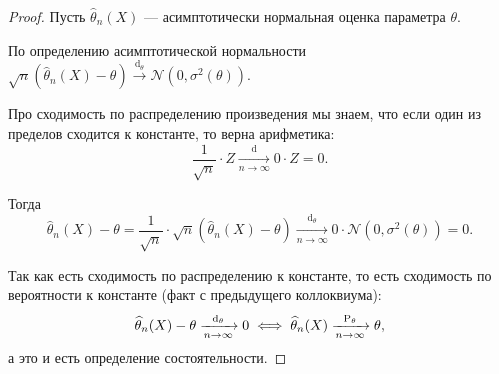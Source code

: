 \begin{proof}
    Пусть $\widehat{\theta}_n(X)$ --- асимптотически нормальная оценка параметра $\theta$.

    По определению асимптотической нормальности $\sqrt{n} \left( \widehat{\theta}_n(X) - \theta \right) \xrightarrow[]{\operatorname{d}_{\theta}} \mathcal{N}(0, \sigma^2 (\theta))$.

    Про сходимость по распределению произведения мы знаем, что если один из пределов сходится к константе, то верна арифметика:
    \begin{equation*}
        \dfrac{1}{\sqrt{n}} \cdot Z \xrightarrow[n \to \infty]{\operatorname{d}} 0 \cdot Z = 0.
    \end{equation*}

    Тогда
    \begin{equation*}
        \widehat{\theta}_n(X) - \theta
        = \dfrac{1}{\sqrt{n}} \cdot \sqrt{n} \left( \widehat{\theta}_n(X) - \theta \right)
        \xrightarrow[n \to \infty]{\operatorname{d}_{\theta}} 
        0 \cdot \mathcal{N}(0, \sigma^2 (\theta))
        = 0.
    \end{equation*}

    Так как есть сходимость по распределению к константе, то есть сходимость по вероятности к константе (факт с предыдущего коллоквиума):
    \begin{equation*}
        \widehat{\theta}_n(X) - \theta
        \xrightarrow[n \to \infty]{\operatorname{d}_{\theta}} 
        0
        \iff 
        \widehat{\theta}_n(X)
        \xrightarrow[n \to \infty]{\P_{\theta}} \theta,
    \end{equation*}
    а это и есть определение состоятельности.
\end{proof}
